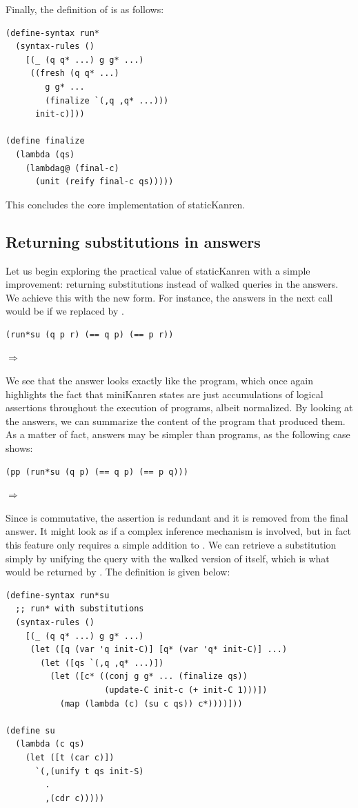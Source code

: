 Finally, the definition of  is as follows:
\begin{lstlisting}
(define-syntax run*
  (syntax-rules ()
    [(_ (q q* ...) g g* ...)
     ((fresh (q q* ...)
        g g* ...
        (finalize `(,q ,q* ...)))
      init-c)]))

(define finalize
  (lambda (qs)
    (lambdag@ (final-c)
      (unit (reify final-c qs)))))
\end{lstlisting}
This concludes the core implementation of staticKanren.

\subsection{Returning substitutions in answers}\label{S}
Let us begin exploring the practical value of staticKanren with a simple improvement: returning substitutions instead of walked queries in the answers. We achieve this with the new  form. For instance, the answers in the next call would be  if we replaced  by .
\begin{lstlisting}
(run*su (q p r) (== q p) (== p r))
\end{lstlisting}
$\Rightarrow$ 

We see that the answer looks exactly like the program, which once again highlights the fact that miniKanren states are just accumulations of logical assertions throughout the execution of programs, albeit normalized. By looking at the answers, we can summarize the content of the program that produced them. As a matter of fact, answers may be simpler than programs, as the following case shows:
\begin{lstlisting}
(pp (run*su (q p) (== q p) (== p q)))
\end{lstlisting}
$\Rightarrow$ 

Since \code{==} is commutative, the assertion  is redundant and it is removed from the final answer. It might look as if a complex inference mechanism is involved, but in fact this feature only requires a simple addition to . We can retrieve a substitution simply by unifying the query with the walked version of itself, which is what would be returned by . The definition  is given below:
\begin{lstlisting}
(define-syntax run*su
  ;; run* with substitutions
  (syntax-rules ()
    [(_ (q q* ...) g g* ...)
     (let ([q (var 'q init-C)] [q* (var 'q* init-C)] ...)
       (let ([qs `(,q ,q* ...)])
         (let ([c* ((conj g g* ... (finalize qs))
                    (update-C init-c (+ init-C 1)))])
           (map (lambda (c) (su c qs)) c*))))]))

(define su
  (lambda (c qs)
    (let ([t (car c)])
      `(,(unify t qs init-S)
        .
        ,(cdr c)))))
\end{lstlisting}

